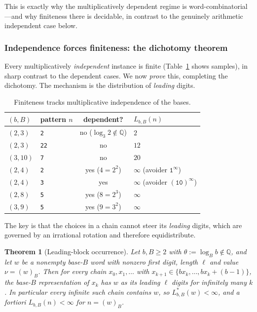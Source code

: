 \documentclass[a4paper]{article}
\theoremstyle{plain}
\newtheorem{theorem}{Theorem}[subsection]
\theoremstyle{definition}
\theoremstyle{remark}
\newcommand{\QQ}{\mathbb{Q}}
\newcommand{\Lbb}[1][b,B]{L_{#1}}
\begin{document}
This is exactly why the multiplicatively dependent regime is word-combinatorial---and why finiteness there is decidable, in contrast to the genuinely arithmetic independent case below.

\subsubsection{Independence forces finiteness: the dichotomy theorem}\label{av:sec:indep}

Every multiplicatively \emph{independent} instance is finite (Table~\ref{av:tab:cross} shows samples), in sharp contrast to the dependent cases. We now \emph{prove} this, completing the dichotomy. The mechanism is the distribution of \emph{leading} digits.

\begin{table}[h]
\centering
\begin{tabular}{llc l}
\toprule
$(b,B)$ & pattern $n$ & dependent? & $\Lbb(n)$ \\
\midrule
$(2,3)$  & \texttt{2}    & no ($\log_3 2\notin\QQ$) & $2$ \\
$(2,3)$  & \texttt{22}   & no & $12$ \\
$(3,10)$ & \texttt{7}    & no & $20$ \\
$(2,4)$  & \texttt{2}    & yes ($4=2^{2}$) & $\infty$ \quad(avoider $\texttt{1}^{\infty}$) \\
$(2,4)$  & \texttt{3}    & yes & $\infty$ \quad(avoider $(\texttt{10})^{\infty}$) \\
$(2,8)$  & \texttt{5}    & yes ($8=2^{3}$) & $\infty$ \\
$(3,9)$  & \texttt{5}    & yes ($9=3^{2}$) & $\infty$ \\
\bottomrule
\end{tabular}
\caption{Finiteness tracks multiplicative independence of the bases.}
\label{av:tab:cross}
\end{table}

The key is that the choices in a chain cannot steer its \emph{leading} digits, which are governed by an irrational rotation and therefore equidistribute.

\begin{theorem}[Leading-block occurrence]\label{av:thm:leading}
Let $b,B\ge2$ with $\theta:=\log_B b\notin\QQ$, and let $w$ be a nonempty base-$B$ word with nonzero first digit, length $\ell$ and value $\nu=(w)_B$. Then for \emph{every} chain $x_0,x_1,\dots$ with $x_{k+1}\in\{bx_k,\dots,bx_k+(b-1)\}$, the base-$B$ representation of $x_k$ has $w$ as its leading $\ell$ digits for infinitely many $k$. In particular every infinite such chain contains $w$, so $L^{*}_{b,B}(w)<\infty$, and a fortiori $\Lbb(n)<\infty$ for $n=(w)_B$.
\end{theorem}
\end{document}
